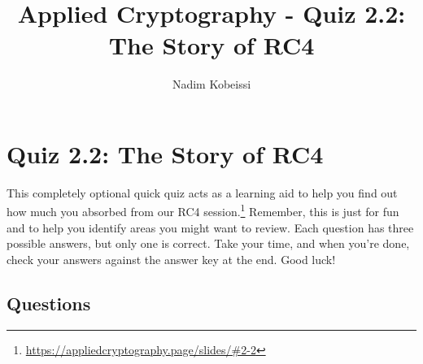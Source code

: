 \documentclass[10pt,a4paper,american]{exam}
\title{Applied Cryptography - Quiz 2.2: The Story of RC4}
\author{Nadim Kobeissi}
\begin{document}
\classhandoutheader
\section*{Quiz 2.2: The Story of RC4}

\begin{tcolorbox}[colframe=OliveGreen!30!white,colback=OliveGreen!5!white]
	This completely optional quick quiz acts as a learning aid to help you find out how much you absorbed from our RC4 session.\footnote{\url{https://appliedcryptography.page/slides/\#2-2}} Remember, this is just for fun and to help you identify areas you might want to review. Each question has three possible answers, but only one is correct. Take your time, and when you're done, check your answers against the answer key at the end. Good luck!
\end{tcolorbox}

\subsection*{Questions}
\end{document}
